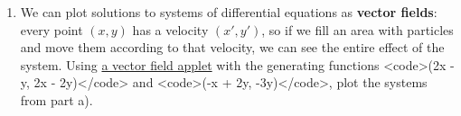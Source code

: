 \documentclass{article}
\begin{document}
\begin{enumerate}

	\item We can plot solutions to systems of differential equations as \textbf{vector fields}: every point $(x, y)$ has a velocity $(x', y')$, so if we fill an area with particles and move them according to that velocity, we can see the entire effect of the system. Using \href{https://cruzgodar.com/applets/vector-fields}{a vector field applet} with the generating functions <code>(2x - y, 2x - 2y)</code> and <code>(-x + 2y, -3y)</code>, plot the systems from part a).

\end{enumerate}
\end{document}
